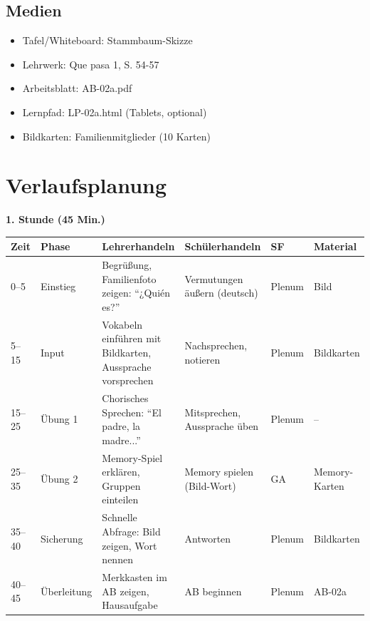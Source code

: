 \documentclass[11pt,a4paper]{article}
\newcommand{\lehrwerk}{Que pasa 1}
\newcommand{\lehrwerkseite}{S. 54-57}
\begin{document}
\subsection{Medien}
\begin{itemize}
    \item Tafel/Whiteboard: Stammbaum-Skizze
    \item Lehrwerk: \lehrwerk, \lehrwerkseite
    \item Arbeitsblatt: AB-02a.pdf
    \item Lernpfad: LP-02a.html (Tablets, optional)
    \item Bildkarten: Familienmitglieder (10 Karten)
\end{itemize}

\section{Verlaufsplanung}

\textbf{1. Stunde (45 Min.)}

\begin{longtable}{|p{1cm}|p{1.5cm}|p{4cm}|p{3cm}|p{1.5cm}|p{2cm}|}
\hline
\textbf{Zeit} & \textbf{Phase} & \textbf{Lehrerhandeln} & \textbf{Schülerhandeln} & \textbf{SF} & \textbf{Material} \\
\hline
\endhead

0--5 & Einstieg & Begrüßung, Familienfoto zeigen: ``¿Quién es?'' & Vermutungen äußern (deutsch) & Plenum & Bild \\
\hline

5--15 & Input & Vokabeln einführen mit Bildkarten, Aussprache vorsprechen & Nachsprechen, notieren & Plenum & Bildkarten \\
\hline

15--25 & Übung 1 & Chorisches Sprechen: ``El padre, la madre...'' & Mitsprechen, Aussprache üben & Plenum & -- \\
\hline

25--35 & Übung 2 & Memory-Spiel erklären, Gruppen einteilen & Memory spielen (Bild-Wort) & GA & Memory-Karten \\
\hline

35--40 & Sicherung & Schnelle Abfrage: Bild zeigen, Wort nennen & Antworten & Plenum & Bildkarten \\
\hline

40--45 & Überleitung & Merkkasten im AB zeigen, Hausaufgabe & AB beginnen & Plenum & AB-02a \\
\hline
\end{longtable}
\end{document}
